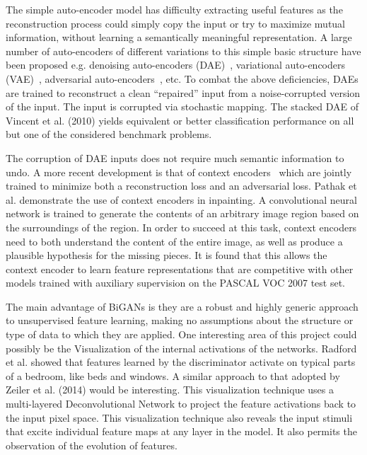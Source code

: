 \documentclass[]{monthly-report}
\begin{document}
The simple auto-encoder model has difficulty extracting useful features as the reconstruction process could simply copy the input or try to maximize mutual information, without learning a semantically meaningful representation. A large number of auto-encoders of different variations to this simple basic structure have been proposed e.g. denoising auto-encoders (DAE)~\cite{vincent2010stacked}, variational auto-encoders (VAE)~\cite{kingma2013auto}, adversarial auto-encoders~\cite{makhzani2015adversarial}, etc. To combat the above deficiencies, DAEs are trained to reconstruct a clean “repaired” input from a noise-corrupted version of the input. The input is corrupted via stochastic mapping. The stacked DAE of Vincent et al. (2010) yields equivalent or better classification performance on all but one of the considered benchmark problems.

The corruption of DAE inputs does not require much semantic
information to undo. A more recent development is that of context encoders~\cite{pathak2016context} which are jointly trained to minimize both a reconstruction loss and an adversarial loss. Pathak et al. demonstrate the use of context encoders in inpainting. A convolutional
neural network is trained to generate the contents of an arbitrary image region based on the surroundings of the region. In order to succeed at this task, context encoders
need to both understand the content of the entire image,
as well as produce a plausible hypothesis for the missing pieces. It is found that this allows the context encoder to learn feature representations that are competitive with other models trained with auxiliary supervision on the PASCAL VOC 2007 test set.

The main advantage of BiGANs is they are a robust and highly generic approach to unsupervised feature learning, making no assumptions about the structure or type of data to which they are applied. One interesting area of this project could possibly be the Visualization of the internal activations of the networks. Radford et al. showed that features learned by the discriminator activate on typical parts of a bedroom, like beds and windows. A similar approach to that adopted by Zeiler et al. (2014)  would be interesting. This visualization technique uses a multi-layered Deconvolutional Network to project the feature activations back to the input pixel space. This visualization technique also reveals the input stimuli that excite individual feature maps at any layer in the model. It also permits the observation of the evolution of features.















\newpage

\begingroup
\raggedright
{}
\endgroup



\label{last_page}

 
\end{document}
